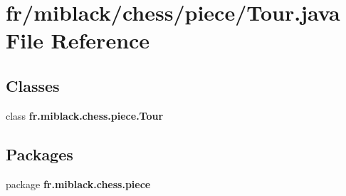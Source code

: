 \section{fr/miblack/chess/piece/\-Tour.java File Reference}
\label{Tour_8java}
\subsection*{Classes}
\begin{DoxyCompactItemize}
\item 
class {\bf fr.\-miblack.\-chess.\-piece.\-Tour}
\end{DoxyCompactItemize}
\subsection*{Packages}
\begin{DoxyCompactItemize}
\item 
package {\bf fr.\-miblack.\-chess.\-piece}
\end{DoxyCompactItemize}

